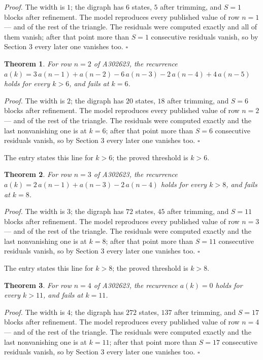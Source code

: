 \documentclass[11pt]{article}
\newtheorem{theorem}{Theorem}
\theoremstyle{definition}
\begin{document}
{\itshape Proof.} The width is $1$; the digraph has $6$ states, $5$ after trimming, and $S = 1$ blocks after refinement. The model reproduces every published value of row $n = 1$ --- and of the rest of the triangle. The residuals were computed exactly and all of them vanish; after that point more than $S = 1$ consecutive residuals vanish, so by Section 3 every later one vanishes too. $\square$

\begin{theorem} For row $n = 2$ of A302623, the recurrence $a(k) = 3\,a(n-1) + a(n-2) - 6\,a(n-3) - 2\,a(n-4) + 4\,a(n-5)$ holds for every $k > 6$, and fails at $k = 6$.\end{theorem}

{\itshape Proof.} The width is $2$; the digraph has $20$ states, $18$ after trimming, and $S = 6$ blocks after refinement. The model reproduces every published value of row $n = 2$ --- and of the rest of the triangle. The residuals were computed exactly and the last nonvanishing one is at $k = 6$; after that point more than $S = 6$ consecutive residuals vanish, so by Section 3 every later one vanishes too. $\square$

The entry states this line for $k > 6$; the proved threshold is $k > 6$.

\begin{theorem} For row $n = 3$ of A302623, the recurrence $a(k) = 2\,a(n-1) + a(n-3) - 2\,a(n-4)$ holds for every $k > 8$, and fails at $k = 8$.\end{theorem}

{\itshape Proof.} The width is $3$; the digraph has $72$ states, $45$ after trimming, and $S = 11$ blocks after refinement. The model reproduces every published value of row $n = 3$ --- and of the rest of the triangle. The residuals were computed exactly and the last nonvanishing one is at $k = 8$; after that point more than $S = 11$ consecutive residuals vanish, so by Section 3 every later one vanishes too. $\square$

The entry states this line for $k > 8$; the proved threshold is $k > 8$.

\begin{theorem} For row $n = 4$ of A302623, the recurrence $a(k) = 0$ holds for every $k > 11$, and fails at $k = 11$.\end{theorem}

{\itshape Proof.} The width is $4$; the digraph has $272$ states, $137$ after trimming, and $S = 17$ blocks after refinement. The model reproduces every published value of row $n = 4$ --- and of the rest of the triangle. The residuals were computed exactly and the last nonvanishing one is at $k = 11$; after that point more than $S = 17$ consecutive residuals vanish, so by Section 3 every later one vanishes too. $\square$
\end{document}
